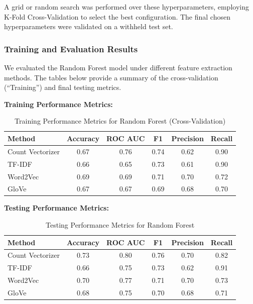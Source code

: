 A grid or random search was performed over these hyperparameters, employing K-Fold Cross-Validation to select the best configuration. The final chosen hyperparameters were validated on a withheld test set.

\subsubsection{Training and Evaluation Results}

We evaluated the Random Forest model under different feature extraction methods. The tables below provide a summary of the cross-validation (“Training”) and final testing metrics.

\textbf{Training Performance Metrics:}

\begin{table}[H]
    \centering
    \caption{Training Performance Metrics for Random Forest (Cross-Validation)}
    \label{tab:rf-training-metrics}
    \begin{tabular}{|l|c|c|c|c|c|}
        \hline
        \textbf{Method} & \textbf{Accuracy} & \textbf{ROC AUC} & \textbf{F1} & \textbf{Precision} & \textbf{Recall} \\ 
        \hline
        Count Vectorizer & 0.67 & 0.76 & 0.74 & 0.62 & 0.90 \\ 
        \hline
        TF-IDF & 0.66 & 0.65 & 0.73 & 0.61 & 0.90 \\ 
        \hline
        Word2Vec & 0.69 & 0.69 & 0.71 & 0.70 & 0.72 \\ 
        \hline
        GloVe & 0.67 & 0.67 & 0.69 & 0.68 & 0.70 \\ 
        \hline
    \end{tabular}
\end{table}

\textbf{Testing Performance Metrics:}

\begin{table}[H]
    \centering
    \caption{Testing Performance Metrics for Random Forest}
    \label{tab:rf-testing-metrics}
    \begin{tabular}{|l|c|c|c|c|c|}
        \hline
        \textbf{Method} & \textbf{Accuracy} & \textbf{ROC AUC} & \textbf{F1} & \textbf{Precision} & \textbf{Recall} \\ 
        \hline
        Count Vectorizer & 0.73 & 0.80 & 0.76 & 0.70 & 0.82 \\ 
        \hline
        TF-IDF & 0.66 & 0.75 & 0.73 & 0.62 & 0.91 \\ 
        \hline
        Word2Vec & 0.70 & 0.77 & 0.71 & 0.70 & 0.73 \\ 
        \hline
        GloVe & 0.68 & 0.75 & 0.70 & 0.68 & 0.71 \\ 
        \hline
    \end{tabular}
\end{table}

